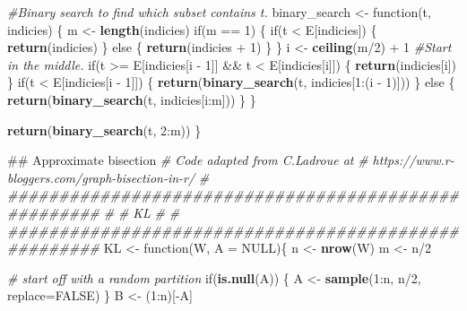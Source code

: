\documentclass[11pt,]{article}
\newenvironment{Shaded}{\begin{snugshade}}{\end{snugshade}}
\newcommand{\KeywordTok}[1]{\textcolor[rgb]{0.13,0.29,0.53}{\textbf{{#1}}}}
\newcommand{\DataTypeTok}[1]{\textcolor[rgb]{0.13,0.29,0.53}{{#1}}}
\newcommand{\DecValTok}[1]{\textcolor[rgb]{0.00,0.00,0.81}{{#1}}}
\newcommand{\StringTok}[1]{\textcolor[rgb]{0.31,0.60,0.02}{{#1}}}
\newcommand{\CommentTok}[1]{\textcolor[rgb]{0.56,0.35,0.01}{\textit{{#1}}}}
\newcommand{\OtherTok}[1]{\textcolor[rgb]{0.56,0.35,0.01}{{#1}}}
\newcommand{\NormalTok}[1]{{#1}}
\begin{document}
\begin{Shaded}
\begin{Highlighting}[]
  \CommentTok{#Binary search to find which subset contains t.}
  \NormalTok{binary_search <-}\StringTok{ }\NormalTok{function(t, indicies) \{}
    \NormalTok{m <-}\StringTok{ }\KeywordTok{length}\NormalTok{(indicies)}
    \NormalTok{if(m ==}\StringTok{ }\DecValTok{1}\NormalTok{) \{}
      \NormalTok{if(t <}\StringTok{ }\NormalTok{E[indicies]) \{}
        \KeywordTok{return}\NormalTok{(indicies)}
      \NormalTok{\} else \{}
        \KeywordTok{return}\NormalTok{(indicies +}\StringTok{ }\DecValTok{1}\NormalTok{)}
      \NormalTok{\}}
    \NormalTok{\}}
    \NormalTok{i <-}\StringTok{ }\KeywordTok{ceiling}\NormalTok{(m/}\DecValTok{2}\NormalTok{) +}\StringTok{ }\DecValTok{1} \CommentTok{#Start in the middle.}
    \NormalTok{if(t >=}\StringTok{ }\NormalTok{E[indicies[i -}\StringTok{ }\DecValTok{1}\NormalTok{]] &&}\StringTok{ }\NormalTok{t <}\StringTok{ }\NormalTok{E[indicies[i]]) \{}
      \KeywordTok{return}\NormalTok{(indicies[i])}
    \NormalTok{\}}
    \NormalTok{if(t <}\StringTok{ }\NormalTok{E[indicies[i -}\StringTok{ }\DecValTok{1}\NormalTok{]]) \{}
      \KeywordTok{return}\NormalTok{(}\KeywordTok{binary_search}\NormalTok{(t, indicies[}\DecValTok{1}\NormalTok{:(i -}\StringTok{ }\DecValTok{1}\NormalTok{)]))}
    \NormalTok{\} else \{}
      \KeywordTok{return}\NormalTok{(}\KeywordTok{binary_search}\NormalTok{(t, indicies[i:m]))}
    \NormalTok{\}}
  \NormalTok{\}}
  
  \KeywordTok{return}\NormalTok{(}\KeywordTok{binary_search}\NormalTok{(t, }\DecValTok{2}\NormalTok{:m))}
\NormalTok{\}}



\NormalTok{## Approximate bisection}
\CommentTok{# Code adapted from C.Ladroue at }
\CommentTok{#  https://www.r-bloggers.com/graph-bisection-in-r/}
\CommentTok{# #####################################################}
\CommentTok{#}
\CommentTok{# KL}
\CommentTok{#}
\CommentTok{# #####################################################}
\NormalTok{KL <-}\StringTok{ }\NormalTok{function(W, }\DataTypeTok{A =} \OtherTok{NULL}\NormalTok{)\{}
  \NormalTok{n <-}\StringTok{ }\KeywordTok{nrow}\NormalTok{(W)}
  \NormalTok{m <-}\StringTok{ }\NormalTok{n/}\DecValTok{2}
  
  \CommentTok{# start off with a random partition}
  \NormalTok{if(}\KeywordTok{is.null}\NormalTok{(A)) \{}
    \NormalTok{A <-}\StringTok{ }\KeywordTok{sample}\NormalTok{(}\DecValTok{1}\NormalTok{:n, n/}\DecValTok{2}\NormalTok{, }\DataTypeTok{replace=}\OtherTok{FALSE}\NormalTok{)}
  \NormalTok{\}}
  \NormalTok{B <-}\StringTok{ }\NormalTok{(}\DecValTok{1}\NormalTok{:n)[-A]}
  

\end{Highlighting}
\end{Shaded}
\end{document}
